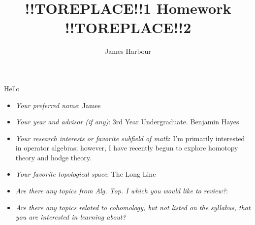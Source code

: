 \documentclass[12pt]{article}
\title{!!TOREPLACE!!1 Homework !!TOREPLACE!!2}
\author{James Harbour}
\begin{document}
\maketitle

Hello

\newpage

\begin{itemize}
    \item \textit{Your preferred name}: James
    \item \textit{Your year and advisor (if any)}: 3rd Year Undergraduate. Benjamin Hayes
    \item \textit{Your research interests or favorite subfield of math}: I'm primarily interested in operator algebras; however, I have recently begun to explore homotopy theory and hodge theory.
    \item \textit{Your favorite topological space}: The Long Line
    \item \textit{Are there any topics from Alg. Top. I which you would like to review?}: 
    \item \textit{Are there any topics related to cohomology, but not listed on the syllabus, that you are interested in learning about?}
\end{itemize}
\end{document}
